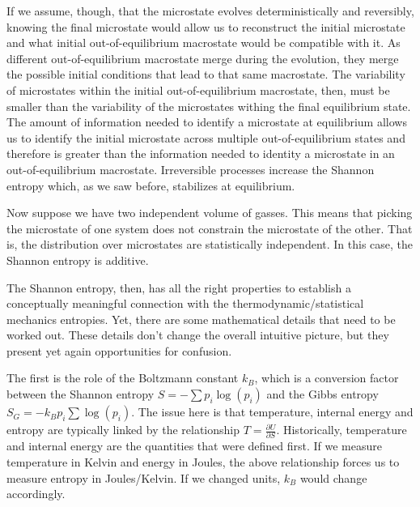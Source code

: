 \documentclass{article}
\begin{document}
If we assume, though, that the microstate evolves deterministically and reversibly, knowing the final microstate would allow us to reconstruct the initial microstate and what initial out-of-equilibrium macrostate would be compatible with it. As different out-of-equilibrium macrostate merge during the evolution, they merge the possible initial conditions that lead to that same macrostate. The variability of microstates within the initial out-of-equilibrium macrostate, then, must be smaller than the variability of the microstates withing the final equilibrium state. The amount of information needed to identify a microstate at equilibrium allows us to identify the initial microstate across multiple out-of-equilibrium states and therefore is greater than the information needed to identity a microstate in an out-of-equilibrium macrostate. Irreversible processes increase the Shannon entropy which, as we saw before, stabilizes at equilibrium.

Now suppose we have two independent volume of gasses. This means that picking the microstate of one system does not constrain the microstate of the other. That is, the distribution over microstates are statistically independent. In this case, the Shannon entropy is additive.

The Shannon entropy, then, has all the right properties to establish a conceptually meaningful connection with the thermodynamic/statistical mechanics entropies. Yet, there are some mathematical details that need to be worked out. These details don't change the overall intuitive picture, but they present yet again opportunities for confusion.

The first is the role of the Boltzmann constant $k_B$, which is a conversion factor between the Shannon entropy $S = - \sum p_i \log(p_i)$ and the Gibbs entropy $S_G = - k_B p_i \sum \log(p_i)$. The issue here is that temperature, internal energy and entropy are typically linked by the relationship $T = \frac{\partial U}{\partial S}$. Historically, temperature and internal energy are the quantities that were defined first. If we measure temperature in Kelvin and energy in Joules, the above relationship forces us to measure entropy in Joules/Kelvin. If we changed units, $k_B$ would change accordingly.
\end{document}
